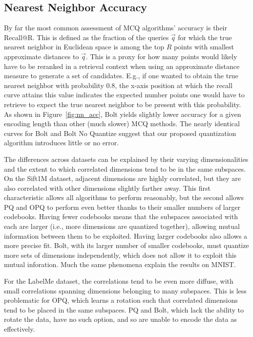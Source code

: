 \subsection{Nearest Neighbor Accuracy}

By far the most common assessment of MCQ algorithms' accuracy is their Recall@R. This is defined as the fraction of the queries $\vec{q}$ for which the true nearest neighbor in Euclidean space is among the top $R$ points with smallest approximate distances to $\vec{q}$. This is a proxy for how many points would likely have to be reranked in a retrieval context when using an approximate distance measure to generate a set of candidates. E.g., if one wanted to obtain the true nearest neighbor with probability $0.8$, the x-axis position at which the recall curve attains this value indicates the expected number points one would have to retrieve to expect the true nearest neighbor to be present with this probability. As shown in Figure~\ref{fig:nn_acc}, Bolt yields slightly lower accuracy for a given encoding length than other (much slower) MCQ methods. The nearly identical curves for Bolt and Bolt No Quantize suggest that our proposed quantization algorithm introduces little or no error.

The differences across datasets can be explained by their varying dimensionalities and the extent to which correlated dimensions tend to be in the same subspaces. On the Sift1M dataset, adjacent dimensions are highly correlated, but they are also correlated with other dimensions slightly farther away. This first characteristic allows all algorithms to perform reasonably, but the second allows PQ and OPQ to perform even better thanks to their smaller numbers of larger codebooks. Having fewer codebooks means that the subspaces associated with each are larger (i.e., more dimensions are quantized together), allowing mutual information between them to be exploited. Having larger codebooks also allows a more precise fit. Bolt, with its larger number of smaller codebooks, must quantize more sets of dimensions independently, which does not allow it to exploit this mutual inforation. Much the same phenomena explain the results on MNIST.

For the LabelMe dataset, the correlations tend to be even more diffuse, with small correlations spanning dimensions belonging to many subspaces. This is less problematic for OPQ, which learns a rotation such that correlated dimensions tend to be placed in the same subspaces. PQ and Bolt, which lack the ability to rotate the data, have no such option, and so are unable to encode the data as effectively.

